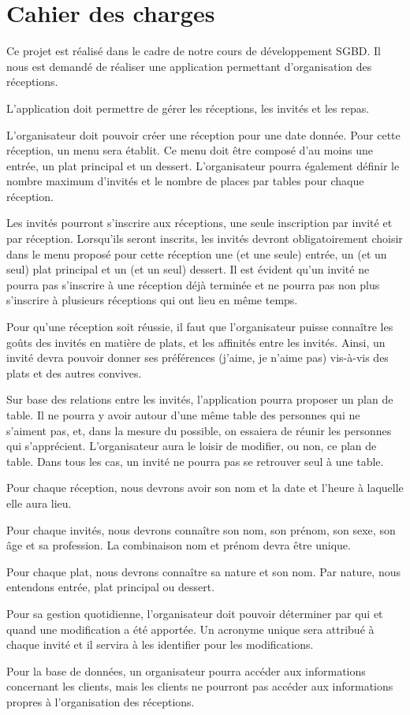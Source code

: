 \chapter{Cahier des charges}

Ce projet est réalisé dans le cadre de notre cours de développement SGBD. Il nous est demandé de réaliser une application permettant d'organisation des réceptions.

L'application doit permettre de gérer les réceptions, les invités et les repas.

L'organisateur doit pouvoir créer une réception pour une date donnée. Pour cette réception, un menu sera établit. Ce menu doit être composé d'au moins une entrée, un plat principal et un dessert. L'organisateur pourra également définir le nombre maximum d'invités et le nombre de places par tables pour chaque réception.

Les invités pourront s'inscrire aux réceptions, une seule inscription par invité et par réception. Lorsqu'ils seront inscrits, les invités devront obligatoirement choisir dans le menu proposé pour cette réception une (et une seule) entrée, un (et un seul) plat principal et un (et un seul) dessert. Il est évident qu'un invité ne pourra pas s'inscrire à une réception déjà terminée et ne pourra pas non plus s'inscrire à plusieurs réceptions qui ont lieu en même temps.

Pour qu'une réception soit réussie, il faut que l'organisateur puisse connaître les goûts des invités en matière de plats, et les affinités entre les invités. Ainsi, un invité devra pouvoir donner ses préférences (\og{}j'aime\fg{}, \og{}je n'aime pas\fg{}) vis-à-vis des plats et des autres convives.

Sur base des relations entre les invités, l'application pourra proposer un plan de table. Il ne pourra y avoir autour d'une même table des personnes qui ne s'aiment pas, et, dans la mesure du possible, on essaiera de réunir les personnes qui s'apprécient. L'organisateur aura le loisir de modifier, ou non, ce plan de table. Dans tous les cas, un invité ne pourra pas se retrouver seul à une table.

Pour chaque réception, nous devrons avoir son nom et la date et l'heure à laquelle elle aura lieu.

Pour chaque invités,  nous devrons connaître son nom, son prénom, son sexe, son âge et sa profession. La combinaison \og{}nom\fg{} et \og{}prénom\fg{} devra être unique.

Pour chaque plat, nous devrons connaître sa nature et son nom. Par nature, nous entendons \og{}entrée\fg{}, \og{}plat principal\fg{} ou \og{}dessert\fg{}.

Pour sa gestion quotidienne, l'organisateur doit pouvoir déterminer par qui et quand une modification a été apportée. Un acronyme unique sera attribué à chaque invité et il servira à les identifier pour les modifications.

Pour la base de données, un organisateur pourra accéder aux informations concernant les clients, mais les clients ne pourront pas accéder aux informations propres à l'organisation des réceptions.